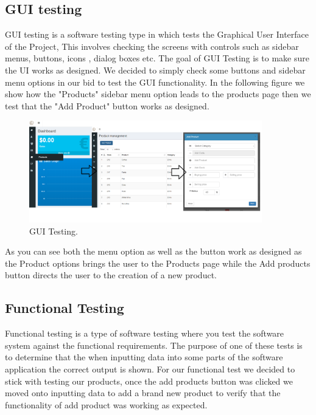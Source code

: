 \subsection{GUI testing}

GUI testing is a software testing type in which tests the Graphical User Interface of the Project, This involves checking the screens with controls such as sidebar menus, buttons, icons , dialog boxes etc. The goal of GUI Testing is to make sure the UI works as designed.
\newline
\newline
We decided to simply check some buttons and sidebar menu options in our bid to test the GUI functionality. In the following figure we show how the "Products" sidebar menu option leads to the products page then we test that the "Add Product" button works as designed.
\newline
\newline


\begin{figure}[h!]
	\caption{GUI Testing.}
	\label{image:myImageName}
	\centering
	\includegraphics[width=0.9\textwidth]{Fig images/guitesting1+2+3.png}
\end{figure}

As you can see both the menu option as well as the button work as designed as the Product options brings the user to the Products page while the Add products button directs the user to the creation of a new product.

\subsection{Functional Testing}

Functional testing is a type of software testing where you test the software system against the functional requirements.  The purpose of one of these tests is to determine that the when inputting data into some parts of the software application the correct output is shown.
\newline
\newline
For our functional test we decided to stick with testing our products, once the add products button was clicked we moved onto inputting data to add a brand new product to verify that the functionality of add product was working as expected.
\newline
\newline


